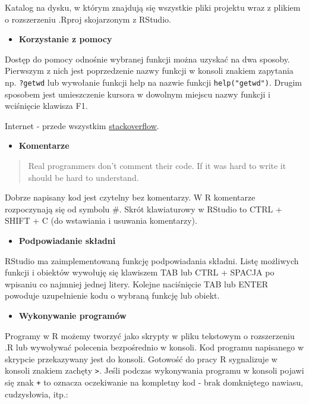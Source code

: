 \documentclass[
  letterpaper,
  DIV=11,
  numbers=noendperiod]{scrreprt}
\providecommand{\tightlist}{%
  \setlength{\itemsep}{0pt}\setlength{\parskip}{0pt}}\usepackage{longtable,booktabs,array}
\begin{document}
Katalog na dysku, w którym znajdują się wszystkie pliki projektu wraz z
plikiem o rozszerzeniu .Rproj skojarzonym z RStudio.

\begin{itemize}
\tightlist
\item
  \textbf{Korzystanie z pomocy}
\end{itemize}

Dostęp do pomocy odnośnie wybranej funkcji można uzyskać na dwa sposoby.
Pierwszym z nich jest poprzedzenie nazwy funkcji w konsoli znakiem
zapytania np. \texttt{?getwd} lub wywołanie funkcji help na nazwie
funkcji \texttt{help("getwd")}. Drugim sposobem jest umieszczenie
kursora w dowolnym miejscu nazwy funkcji i wciśnięcie klawisza F1.

Internet - przede wszystkim
\href{https://stackoverflow.com/questions/tagged/r}{stackoverflow}.

\begin{itemize}
\tightlist
\item
  \textbf{Komentarze}
\end{itemize}

\begin{quote}
Real programmers don't comment their code. If it was hard to write it
should be hard to understand.
\end{quote}

Dobrze napisany kod jest czytelny bez komentarzy. W R komentarze
rozpoczynają się od symbolu \#. Skrót klawiaturowy w RStudio to CTRL +
SHIFT + C (do wstawiania i usuwania komentarzy).

\begin{itemize}
\tightlist
\item
  \textbf{Podpowiadanie składni}
\end{itemize}

RStudio ma zaimplementowaną funkcję podpowiadania składni. Listę
możliwych funkcji i obiektów wywołuję się klawiszem TAB lub CTRL +
SPACJA po wpisaniu co najmniej jednej litery. Kolejne naciśnięcie TAB
lub ENTER powoduje uzupełnienie kodu o wybraną funkcję lub obiekt.

\begin{itemize}
\tightlist
\item
  \textbf{Wykonywanie programów}
\end{itemize}

Programy w R możemy tworzyć jako skrypty w pliku tekstowym o
rozszerzeniu .R lub wywoływać polecenia bezpośrednio w konsoli. Kod
programu napisanego w skrypcie przekazywany jest do konsoli. Gotowość do
pracy R sygnalizuje w konsoli znakiem zachęty \texttt{\textgreater{}}.
Jeśli podczas wykonywania programu w konsoli pojawi się znak \texttt{+}
to oznacza oczekiwanie na kompletny kod - brak domkniętego nawiasu,
cudzysłowia, itp.:
\end{document}
